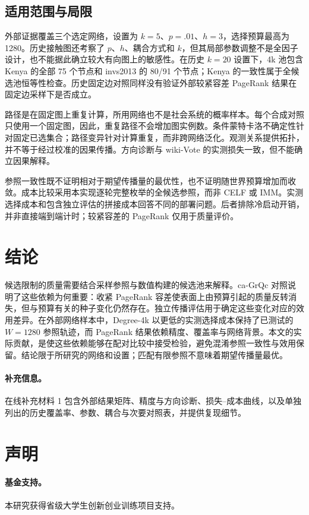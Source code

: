 \documentclass[smallextended]{svjour3}
\begin{document}
\subsection{适用范围与局限}
外部证据覆盖三个选定网络，设置为 $k=5$、$p=.01$、$h=3$，选择预算最高为 1280。历史接触图还考察了 $p$、$h$、耦合方式和 $k$，但其局部参数调整不是全因子设计，也不能据此确立较大有向图上的敏感性。在历史 $k=20$ 设置下，4k 池包含 Kenya 的全部 75 个节点和 invs2013 的 80/91 个节点；Kenya 的一致性属于全候选池恒等性检查。历史固定边对照同样没有验证外部较紧容差 PageRank 结果在固定边采样下是否成立。

路径是在固定图上重复计算，所用网络也不是社会系统的概率样本。每个合成对照只使用一个固定图，因此，重复路径不会增加图实例数。条件蒙特卡洛不确定性针对固定已选集合；路径变异针对计算重复，而非跨网络泛化。观测关系提供拓扑，并不等于经过校准的因果传播。方向诊断与 wiki-Vote 的实测损失一致，但不能确立因果解释。

参照一致性既不证明相对于期望传播量的最优性，也不证明随世界预算增加而收敛。成本比较采用本实现逐轮完整枚举的全候选参照，而非 CELF 或 IMM。实测选择成本和包含独立评估的拼接成本回答不同的部署问题。后者排除冷启动开销，并非直接端到端计时；较紧容差的 PageRank 仅用于质量评价。

\section{结论}
候选限制的质量需要结合采样参照与数值构建的候选池来解释。ca-GrQc 对照说明了这些依赖为何重要：收紧 PageRank 容差使表面上由预算引起的质量反转消失，但与预算有关的种子变化仍然存在。独立传播评估用于确定这些变化对应的效用差异。在外部网络样本中，Degree-4k 以更低的实测选择成本保持了已测试的 $W=1280$ 参照轨迹，而 PageRank 结果依赖精度、覆盖率与网络背景。本文的实际贡献，是使这些依赖能够在配对比较中接受检验，避免混淆参照一致性与效用保留。结论限于所研究的网络和设置；匹配有限参照不意味着期望传播量最优。

\paragraph{补充信息。}在线补充材料 1 包含外部结果矩阵、精度与方向诊断、损失--成本曲线，以及单独列出的历史覆盖率、参数、耦合与次要对照表，并提供复现细节。
\section*{声明}
\paragraph{基金支持。}本研究获得省级大学生创新创业训练项目支持。
\end{document}
